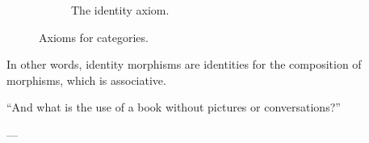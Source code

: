 \begin{definition}
\begin{itemize}
\begin{figure}
\begin{subfigure}[b]{0.5\linewidth}
\begin{center}
        \end{center}
        \caption{The identity axiom.}
        \label{fig:category-identity}
      \end{subfigure}
      \caption{Axioms for categories.}
      \label{fig:category-axioms}
    \end{figure}

  \end{itemize}
  In other words, identity morphisms are identities for the
  composition of morphisms, which is associative.

\end{definition}

\epigraph{
  ``And what is the use of a book without pictures or conversations?''
}{---\textcite[13]{carroll-2004}}

